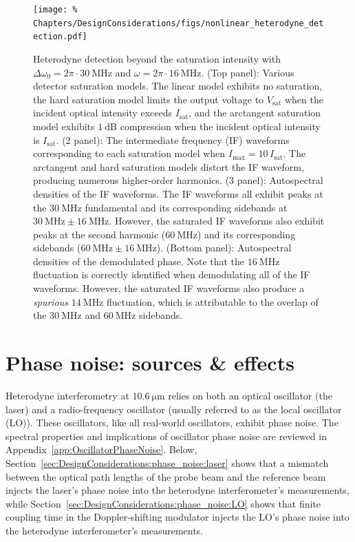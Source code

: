 \begin{figure}
  \centering
  \texttt{[image: \%
    Chapters/DesignConsiderations/figs/nonlinear\_heterodyne\_detection.pdf]}
  \caption[Heterodyne detection beyond the saturation intensity]{%
    Heterodyne detection beyond the saturation intensity with
    $\Delta\omega_0 = 2\pi \cdot \SI{30}{\mega\hertz}$ and
    $\omega = 2 \pi \cdot \SI{16}{\mega\hertz}$.
    (Top panel): Various detector saturation models.
    The linear model exhibits no saturation,
    the hard saturation model limits the output voltage
    to $V_{\text{sat}}$ when the incident optical intensity
    exceeds $I_{\text{sat}}$, and
    the arctangent saturation model exhibits $\SI{1}{\deci\bel}$ compression
    when the incident optical intensity is $I_{\text{sat}}$.
    (2 panel): The intermediate frequency (IF) waveforms
    corresponding to each saturation model when
    $I_{\text{max}} = 10 \, I_{\text{sat}}$.
    The arctangent and hard saturation models distort the IF waveform,
    producing numerous higher-order harmonics.
    (3 panel): Autospectral densities of the IF waveforms.
    The IF waveforms all exhibit peaks at
    the $\SI{30}{\mega\hertz}$ fundamental and
    its corresponding sidebands at
    $\SI{30}{\mega\hertz} \pm \SI{16}{\mega\hertz}$.
    However, the saturated IF waveforms
    also exhibit peaks at the second harmonic ($\SI{60}{\mega\hertz}$)
    and its corresponding sidebands
    ($\SI{60}{\mega\hertz} \pm \SI{16}{\mega\hertz}$).
    (Bottom panel): Autospectral densities of the demodulated phase.
    Note that the $\SI{16}{\mega\hertz}$ fluctuation is correctly identified
    when demodulating all of the IF waveforms.
    However, the saturated IF waveforms also produce
    a \emph{spurious} $\SI{14}{\mega\hertz}$ fluctuation,
    which is attributable to the overlap of
    the $\SI{30}{\mega\hertz}$ and $\SI{60}{\mega\hertz}$ sidebands.
  }
\label{fig:DesignConsiderations:nonlinear_heterodyne_detection}
\end{figure}


\section{Phase noise: sources \& effects}
\label{sec:DesignConsiderations:phase_noise}
Heterodyne interferometry at $\SI{10.6}{\micro\meter}$ relies on both
an optical oscillator (the laser) and
a radio-frequency oscillator
(usually referred to as the local oscillator (LO)).
These oscillators, like all real-world oscillators, exhibit phase noise.
The spectral properties and implications of oscillator phase noise
are reviewed in Appendix~\ref{app:OscillatorPhaseNoise}.
Below, Section~\ref{sec:DesignConsiderations:phase_noise:laser}
shows that a mismatch between the optical path lengths
of the probe beam and the reference beam
injects the laser's phase noise
into the heterodyne interferometer's measurements, while
Section~\ref{sec:DesignConsiderations:phase_noise:LO}
shows that finite coupling time
in the Doppler-shifting modulator
injects the LO's phase noise
into the heterodyne interferometer's measurements.


